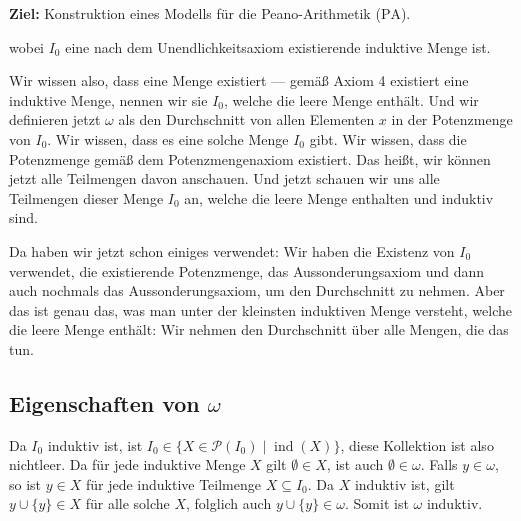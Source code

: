 \begin{math-stroke}
\textbf{Ziel:} Konstruktion eines Modells für die Peano-Arithmetik ($\text{PA}$).

wobei $I_0$ eine nach dem Unendlichkeitsaxiom existierende induktive Menge ist.
\end{math-stroke}

\begin{spoken-clean}[00:46:16 - 00:47:57]
Wir wissen also, dass eine Menge existiert --- gemäß Axiom 4 existiert eine induktive Menge, nennen wir sie $I_0$, welche die leere Menge enthält. Und wir definieren jetzt $\omega$ als den Durchschnitt von allen Elementen $x$ in der Potenzmenge von $I_0$. Wir wissen, dass es eine solche Menge $I_0$ gibt. Wir wissen, dass die Potenzmenge gemäß dem Potenzmengenaxiom existiert. Das heißt, wir können jetzt alle Teilmengen davon anschauen. Und jetzt schauen wir uns alle Teilmengen dieser Menge $I_0$ an, welche die leere Menge enthalten und induktiv sind.

Da haben wir jetzt schon einiges verwendet: Wir haben die Existenz von $I_0$ verwendet, die existierende Potenzmenge, das Aussonderungsaxiom und dann auch nochmals das Aussonderungsaxiom, um den Durchschnitt zu nehmen. Aber das ist genau das, was man unter der kleinsten induktiven Menge versteht, welche die leere Menge enthält: Wir nehmen den Durchschnitt über alle Mengen, die das tun.
\end{spoken-clean}

\subsection{Eigenschaften von \texorpdfstring{$\omega$}{omega}}
\begin{math-stroke}
\begin{short-proof}
Da $I_0$ induktiv ist, ist $I_0 \in \{ X \in \mathcal{P}(I_0) \mid \operatorname{ind}(X) \}$, diese Kollektion ist also nichtleer. Da für jede induktive Menge $X$ gilt $\emptyset \in X$, ist auch $\emptyset \in \omega$.
Falls $y \in \omega$, so ist $y \in X$ für jede induktive Teilmenge $X \subseteq I_0$. Da $X$ induktiv ist, gilt $y \cup \{y\} \in X$ für alle solche $X$, folglich auch $y \cup \{y\} \in \omega$. Somit ist $\omega$ induktiv.
\end{short-proof}
\end{math-stroke}

